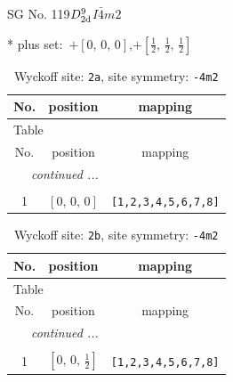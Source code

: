 \documentclass[fleqn,8pt]{jsarticle}
\begin{document}
\setcounter{MaxMatrixCols}{32}

\renewcommand{\tablename}{Table~}
\renewcommand{\figurename}{Figure~}
\begin{center}
\LARGE
SG No. 119\quad$D_{\rm 2d}^{9}$\quad$I\bar{4}m2$\quad[ tetragonal ]
\end{center}
* plus set:\,\,\,$+\left[ 0,\, 0,\, 0 \right]$,\quad $+\left[ \frac{1}{2},\, \frac{1}{2},\, \frac{1}{2} \right]$
\renewcommand{\arraystretch}{1.2}
\begin{longtable}{ccc}
\caption{Wyckoff site: {\tt 2a}, site symmetry: {\tt -4m2}}
 \\
 \hline \hline
No. & position & mapping \\ \hline \endfirsthead

\multicolumn{2}{l}{\tablename\ \thetable{}} \\
 \hline \hline
No. & position & mapping \\ \hline \endhead

 \hline \hline
\multicolumn{2}{r}{\footnotesize\it continued ...} \\ \endfoot

 \hline \hline
\multicolumn{2}{r}{} \\ \endlastfoot

1 & $\left[ 0,\, 0,\, 0 \right]$ & {\tt [1,2,3,4,5,6,7,8]} \\
\end{longtable}
\renewcommand{\arraystretch}{1.2}
\begin{longtable}{ccc}
\caption{Wyckoff site: {\tt 2b}, site symmetry: {\tt -4m2}}
 \\
 \hline \hline
No. & position & mapping \\ \hline \endfirsthead

\multicolumn{2}{l}{\tablename\ \thetable{}} \\
 \hline \hline
No. & position & mapping \\ \hline \endhead

 \hline \hline
\multicolumn{2}{r}{\footnotesize\it continued ...} \\ \endfoot

 \hline \hline
\multicolumn{2}{r}{} \\ \endlastfoot

1 & $\left[ 0,\, 0,\, \frac{1}{2} \right]$ & {\tt [1,2,3,4,5,6,7,8]} \\
\end{longtable}
\renewcommand{\arraystretch}{1.2}
\end{document}
